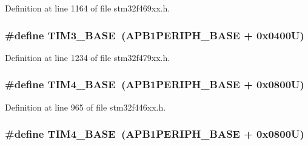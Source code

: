 Definition at line 1164 of file stm32f469xx.\+h.

\subsubsection[{\texorpdfstring{T\+I\+M3\+\_\+\+B\+A\+SE}{TIM3_BASE}}]{\setlength{\rightskip}{0pt plus 5cm}\#define T\+I\+M3\+\_\+\+B\+A\+SE~({\bf A\+P\+B1\+P\+E\+R\+I\+P\+H\+\_\+\+B\+A\+SE} + 0x0400\+U)}\hypertarget{group___peripheral__memory__map_gaf0c34a518f87e1e505cd2332e989564a}{}\label{group___peripheral__memory__map_gaf0c34a518f87e1e505cd2332e989564a}


Definition at line 1234 of file stm32f479xx.\+h.

\subsubsection[{\texorpdfstring{T\+I\+M4\+\_\+\+B\+A\+SE}{TIM4_BASE}}]{\setlength{\rightskip}{0pt plus 5cm}\#define T\+I\+M4\+\_\+\+B\+A\+SE~({\bf A\+P\+B1\+P\+E\+R\+I\+P\+H\+\_\+\+B\+A\+SE} + 0x0800\+U)}\hypertarget{group___peripheral__memory__map_ga56e2d44b0002f316527b8913866a370d}{}\label{group___peripheral__memory__map_ga56e2d44b0002f316527b8913866a370d}


Definition at line 965 of file stm32f446xx.\+h.

\subsubsection[{\texorpdfstring{T\+I\+M4\+\_\+\+B\+A\+SE}{TIM4_BASE}}]{\setlength{\rightskip}{0pt plus 5cm}\#define T\+I\+M4\+\_\+\+B\+A\+SE~({\bf A\+P\+B1\+P\+E\+R\+I\+P\+H\+\_\+\+B\+A\+SE} + 0x0800\+U)}\hypertarget{group___peripheral__memory__map_ga56e2d44b0002f316527b8913866a370d}{}\label{group___peripheral__memory__map_ga56e2d44b0002f316527b8913866a370d}


